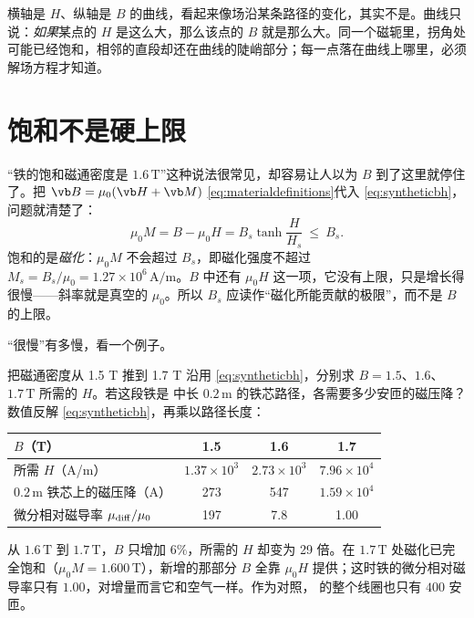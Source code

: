 \begin{pitfall}[“B--H 曲线就是场沿某条路径的分布”]
横轴是 $H$、纵轴是 $B$ 的曲线，看起来像场沿某条路径的变化，其实不是。曲线只说：\emph{如果}某点的 $H$ 是这么大，那么该点的 $B$ 就是那么大。同一个磁轭里，拐角处可能已经饱和，相邻的直段却还在曲线的陡峭部分；每一点落在曲线上哪里，必须解场方程才知道。
\end{pitfall}

\section{饱和不是硬上限}\label{sec:bh-saturation}

“铁的饱和磁通密度是 $1.6\,\mathrm T$”这种说法很常见，却容易让人以为 $B$ 到了这里就停住了。把 $\vb B=\mu_0(\vb H+\vb M)$ \eqref{eq:materialdefinitions}代入 \eqref{eq:syntheticbh}，问题就清楚了：
\begin{equation}
\mu_0M=B-\mu_0H=B_s\tanh\frac{H}{H_s}\ \le\ B_s .
\label{eq:bh-magnetization}
\end{equation}
饱和的是\emph{磁化}：$\mu_0M$ 不会超过 $B_s$，即磁化强度不超过 $M_s=B_s/\mu_0=1.27\times10^6\,\mathrm{A/m}$。$B$ 中还有 $\mu_0H$ 这一项，它没有上限，只是增长得很慢——斜率就是真空的 $\mu_0$。所以 $B_s$ 应读作“磁化所能贡献的极限”，而不是 $B$ 的上限。

“很慢”有多慢，看一个例子。

\begin{example}[label=ex:bh-saturation]{把磁通密度从 1.5 T 推到 1.7 T}
沿用 \eqref{eq:syntheticbh}，分别求 $B=1.5$、$1.6$、$1.7\,\mathrm T$ 所需的 $H$。若这段铁是 中长 $0.2\,\mathrm m$ 的铁芯路径，各需要多少安匝的磁压降？
\solution
数值反解 \eqref{eq:syntheticbh}，再乘以路径长度：
\begin{center}\small
\begin{tabular}{@{}lccc@{}}
\toprule
$B$（T） & 1.5 & 1.6 & 1.7\\\midrule
所需 $H$（A/m） & $1.37\times10^3$ & $2.73\times10^3$ & $7.96\times10^4$\\
$0.2\,\mathrm m$ 铁芯上的磁压降（A） & 273 & 547 & $1.59\times10^4$\\
微分相对磁导率 $\mu_{\rm diff}/\mu_0$ & 197 & 7.8 & 1.00\\
\bottomrule
\end{tabular}
\end{center}
从 $1.6\,\mathrm T$ 到 $1.7\,\mathrm T$，$B$ 只增加 6\%，所需的 $H$ 却变为 29 倍。在 $1.7\,\mathrm T$ 处磁化已完全饱和（$\mu_0M=1.600\,\mathrm T$），新增的那部分 $B$ 全靠 $\mu_0H$ 提供；这时铁的微分相对磁导率只有 $1.00$，对增量而言它和空气一样。作为对照， 的整个线圈也只有 $400$ 安匝。
\end{example}

